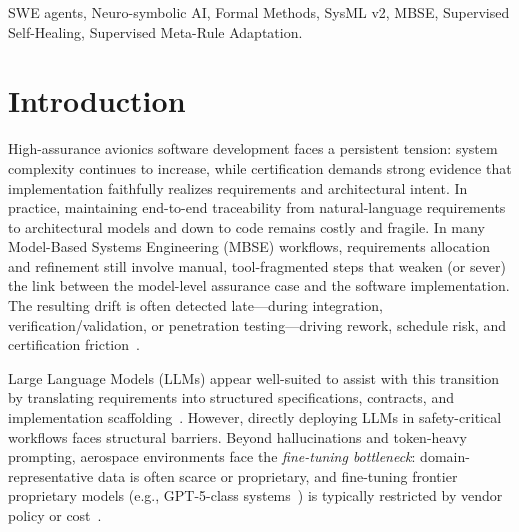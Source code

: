 \documentclass[conference]{IEEEtran}
\begin{document}
\begin{abstract}
We evaluate our methodology on safety-critical systems using an example sourced from an FAA requirements guidebook ($>$37 pages) relevant to avionics and cyber-physical domains. Our copilot achieved 100\% code-level verification and a 58$\times$ increase in development task throughput compared to a baseline that, lacking Meta-Rules, failed to produce verifiable artifacts. This demonstrates a practical path to certification-grade automation under strict data and model governance constraints, reconciling the efficiency of Generative AI with the strict rigor required for certifiable critical system software.
\end{abstract}

\begin{IEEEkeywords}
SWE agents, Neuro-symbolic AI, Formal Methods, SysML v2, MBSE, Supervised Self-Healing, Supervised Meta-Rule Adaptation.
\end{IEEEkeywords}

\section{Introduction}

High-assurance avionics software development faces a persistent tension: system complexity continues to increase, while certification demands strong evidence that implementation faithfully realizes requirements and architectural intent. In practice, maintaining end-to-end traceability from natural-language requirements to architectural models and down to code remains costly and fragile. In many Model-Based Systems Engineering (MBSE) workflows, requirements allocation and refinement still involve manual, tool-fragmented steps that weaken (or sever) the link between the model-level assurance case and the software implementation. The resulting drift is often detected late---during integration, verification/validation, or penetration testing---driving rework, schedule risk, and certification friction~\cite{hardin2025dasc}.

Large Language Models (LLMs) appear well-suited to assist with this transition by translating requirements into structured specifications, contracts, and implementation scaffolding~\cite{openai-gpt5-2-codex}. However, directly deploying LLMs in safety-critical workflows faces structural barriers. Beyond hallucinations and token-heavy prompting, aerospace environments face the \emph{fine-tuning bottleneck}: domain-representative data is often scarce or proprietary, and fine-tuning frontier proprietary models (e.g., GPT-5-class systems~\cite{bubeck2025earlyscienceaccelerationexperiments}) is typically restricted by vendor policy or cost~\cite{gpt5-system-card,openai-gpt5-2-codex}.
\end{document}
